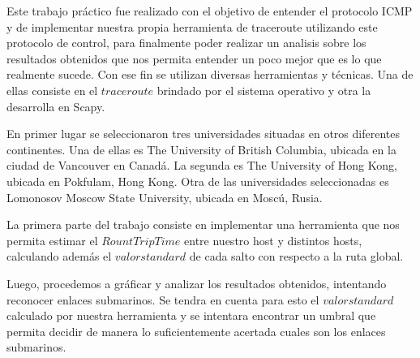 Este trabajo pr\'actico fue realizado con el objetivo de entender el protocolo ICMP y de implementar nuestra propia herramienta de traceroute utilizando este protocolo de control, para finalmente poder realizar un analisis sobre los resultados obtenidos que nos permita entender un poco mejor que es lo que realmente sucede.
Con ese fin se utilizan diversas herramientas y técnicas. Una de ellas consiste en el $traceroute$ brindado por el sistema operativo y otra la desarrolla en Scapy. 

En primer lugar se seleccionaron tres universidades situadas en otros diferentes continentes. Una de ellas 
es The University of British Columbia, ubicada en la ciudad de Vancouver en Canadá. La segunda es The University of Hong Kong, ubicada en Pokfulam, Hong Kong. Otra de las universidades seleccionadas es Lomonosov Moscow State University, ubicada en Moscú, Rusia.

La primera parte del trabajo consiste en implementar una herramienta que nos permita estimar el $Rount Trip Time$ entre nuestro host y distintos hosts, calculando adem\'as el $valor standard$ de  cada salto con respecto a la ruta global.

Luego, procedemos a gr\'aficar y analizar los resultados obtenidos, intentando reconocer enlaces submarinos. Se tendra en cuenta para esto el $valor standard$ calculado por nuestra herramienta y se intentara encontrar un umbral que permita decidir de manera lo suficientemente acertada cuales son los enlaces submarinos.